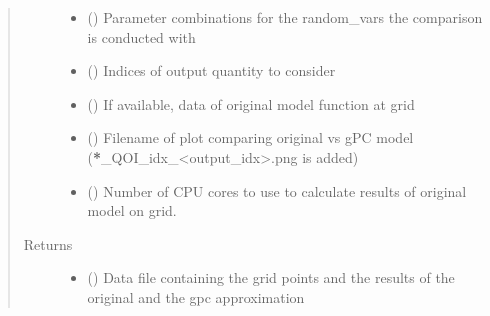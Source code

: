 \documentclass[letterpaper,10pt,english,openany,oneside]{sphinxmanual}
\begin{document}
\begin{fulllineitems}
\begin{quote}
\begin{description}
\begin{itemize}
\item {} 
 (\sphinxstyleliteralemphasis{\sphinxupquote{ {[}}}\sphinxstyleliteralemphasis{\sphinxupquote{{]}}}) \textendash{} Parameter combinations for the random\_vars the comparison is conducted with

\item {} 
 (\sphinxstyleliteralemphasis{\sphinxupquote{, }}\sphinxstyleliteralemphasis{\sphinxupquote{, }}) \textendash{} Indices of output quantity to consider

\item {} 
 (\sphinxstyleliteralemphasis{\sphinxupquote{ {[}}}\sphinxstyleliteralemphasis{\sphinxupquote{{]}}}\sphinxstyleliteralemphasis{\sphinxupquote{, }}\sphinxstyleliteralemphasis{\sphinxupquote{, }}) \textendash{} If available, data of original model function at grid

\item {} 
 () \textendash{} Filename of plot comparing original vs gPC model ({\color{red}\bfseries{}*}\_QOI\_idx\_\textless{}output\_idx\textgreater{}.png is added)

\item {} 
 (\sphinxstyleliteralemphasis{\sphinxupquote{, }}) \textendash{} Number of CPU cores to use to calculate results of original model on grid.

\end{itemize}

\item[{Returns}] \leavevmode
\begin{itemize}
\item {} 
 () \textendash{} Data file containing the grid points and the results of the original and the gpc approximation


\end{itemize}
\end{description}
\end{quote}
\end{fulllineitems}
\end{document}
